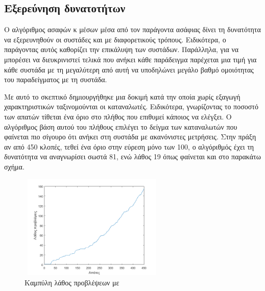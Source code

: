 \subsection{Εξερεύνηση δυνατοτήτων }
Ο αλγόριθμος ασαφών κ μέσων μέσα από τον παράγοντα ασάφιας δίνει τη δυνατότητα να εξερευνηθούν οι συστάδες και με διαφορετικούς τρόπους. Ειδικότερα, ο παράγοντας αυτός καθορίζει την επικάλυψη των συστάδων. Παράλληλα, για να μπορέσει να διευκρινιστεί τελικά που ανήκει κάθε παράδειγμα παρέχεται μια τιμή για κάθε συστάδα με τη μεγαλύτερη από αυτή να υποδηλώνει μεγάλο βαθμό ομοιότητας του παραδείγματος με τη συστάδα.\par
Με αυτό το σκεπτικό δημιουργήθηκε μια δοκιμή κατά την οποία χωρίς εξαγωγή χαρακτηριστικών ταξινομούνται οι καταναλωτές. Ειδικότερα, γνωρίζοντας το ποσοστό των απατών τίθεται ένα όριο στο πλήθος που επιθυμεί κάποιος να ελέγξει. Ο αλγόριθμος βάση αυτού του πλήθους επιλέγει το δείγμα των καταναλωτών που φαίνεται πιο σίγουρο ότι ανήκει στη συστάδα με ακανόνιστες μετρήσεις. Στην πράξη αν από 450 κλοπές, τεθεί ένα όριο στην εύρεση μόνο των 100, ο αλγόριθμός έχει τη δυνατότητα να αναγνωρίσει σωστά 81, ενώ λάθος 19 όπως φαίνεται και στο παρακάτω σχήμα.\par
\begin{figure}[ht!]
\centering
 \includegraphics[width=70mm, height=50mm]{../../plots/confident_predictions.png}
\caption{Καμπύλη λάθος προβλέψεων με }
\label{fig:wrongpredFCM}
\end{figure}
